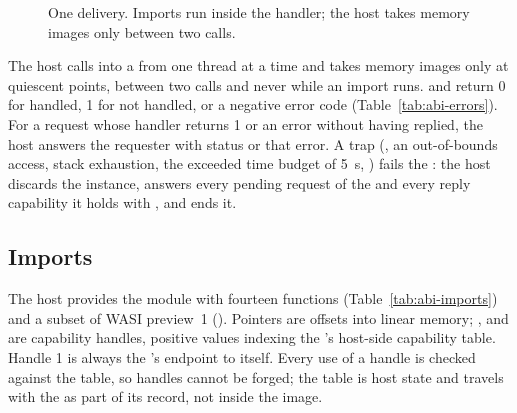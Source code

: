 \begin{figure}[htbp]
\centering
{}
\caption{One delivery. Imports run inside the handler; the host takes memory images only between two calls.}
\label{fig:abi-call}
\end{figure}

The host calls into a \paglet{} from one thread at a time and takes memory
images only at quiescent points, between two calls and never while an
import runs.  and 
return 0 for handled, 1 for not handled, or a negative error code
(Table~\ref{tab:abi-errors}). For a request whose handler returns 1 or an
error without having replied, the host answers the requester with status
 or that error. A trap (, an
out-of-bounds access, stack exhaustion, the exceeded time budget of 5~s,
) fails the \paglet{}: the host discards the instance,
answers every pending request of the \paglet{} and every reply capability
it holds with , and ends it.

\subsection{Imports}\label{sec:abi-imports}

The host provides the module  with fourteen functions
(Table~\ref{tab:abi-imports}) and a subset of WASI preview~1
(). Pointers are  offsets into
linear memory; ,  and  are
capability handles, positive  values indexing the \paglet{}'s
host-side capability table. Handle 1 is always the \paglet{}'s endpoint to
itself. Every use of a handle is checked against the table, so handles
cannot be forged; the table is host state and travels with the \paglet{}
as part of its record, not inside the image.

